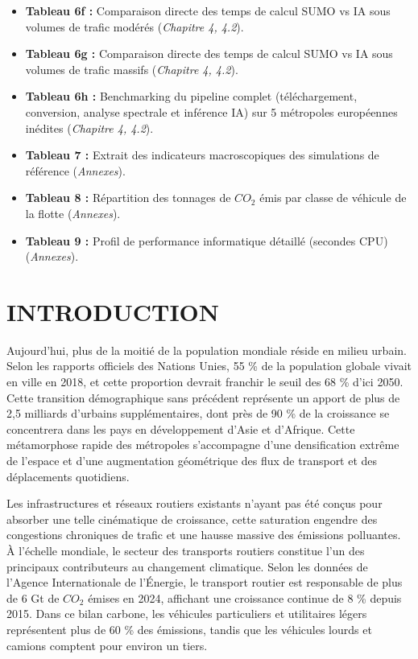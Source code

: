 \documentclass[10pt, a4paper]{article}
\begin{document}
\begin{itemize}
\item
  \textbf{Tableau 6f :} Comparaison directe des temps de calcul SUMO vs
  IA sous volumes de trafic modérés (\emph{Chapitre 4, 4.2}).
\item
  \textbf{Tableau 6g :} Comparaison directe des temps de calcul SUMO vs
  IA sous volumes de trafic massifs (\emph{Chapitre 4, 4.2}).
\item
  \textbf{Tableau 6h :} Benchmarking du pipeline complet
  (téléchargement, conversion, analyse spectrale et inférence IA) sur 5
  métropoles européennes inédites (\emph{Chapitre 4, 4.2}).
\item
  \textbf{Tableau 7 :} Extrait des indicateurs macroscopiques des
  simulations de référence (\emph{Annexes}).
\item
  \textbf{Tableau 8 :} Répartition des tonnages de \(CO_2\) émis par
  classe de véhicule de la flotte (\emph{Annexes}).
\item
  \textbf{Tableau 9 :} Profil de performance informatique détaillé
  (secondes CPU) (\emph{Annexes}).
\end{itemize}

\newpage

\section{INTRODUCTION}\label{introduction}

Aujourd'hui, plus de la moitié de la population mondiale réside en
milieu urbain. Selon les rapports officiels des Nations Unies, 55 \% de
la population globale vivait en ville en 2018, et cette proportion
devrait franchir le seuil des 68 \% d'ici 2050. Cette transition
démographique sans précédent représente un apport de plus de 2,5
milliards d'urbains supplémentaires, dont près de 90 \% de la croissance
se concentrera dans les pays en développement d'Asie et d'Afrique. Cette
métamorphose rapide des métropoles s'accompagne d'une densification
extrême de l'espace et d'une augmentation géométrique des flux de
transport et des déplacements quotidiens.

Les infrastructures et réseaux routiers existants n'ayant pas été conçus
pour absorber une telle cinématique de croissance, cette saturation
engendre des congestions chroniques de trafic et une hausse massive des
émissions polluantes. À l'échelle mondiale, le secteur des transports
routiers constitue l'un des principaux contributeurs au changement
climatique. Selon les données de l'Agence Internationale de l'Énergie,
le transport routier est responsable de plus de 6 Gt de \(CO_2\) émises
en 2024, affichant une croissance continue de 8 \% depuis 2015. Dans ce
bilan carbone, les véhicules particuliers et utilitaires légers
représentent plus de 60 \% des émissions, tandis que les véhicules
lourds et camions comptent pour environ un tiers.
\end{document}
